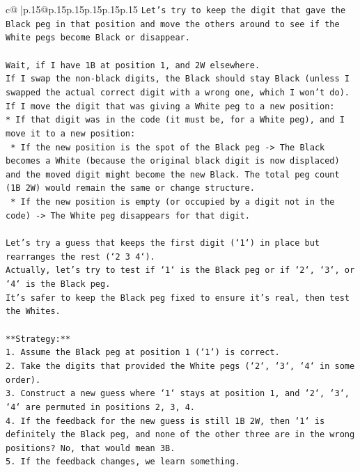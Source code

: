 \documentclass{article}
\begin{document}
{\begin{supertabular}{c@{$\;$}|p{.15\linewidth}@{}p{.15\linewidth}p{.15\linewidth}p{.15\linewidth}p{.15\linewidth}p{.15\linewidth}}
{{{\texttt{Let's try to keep the digit that gave the Black peg in that position and move the others around to see if the White pegs become Black or disappear.} \\
\\ 
\texttt{Wait, if I have 1B at position 1, and 2W elsewhere.} \\
\texttt{If I swap the non{-}black digits, the Black should stay Black (unless I swapped the actual correct digit with a wrong one, which I won't do).} \\
\texttt{If I move the digit that was giving a White peg to a new position:} \\
\texttt{*   If that digit was in the code (it must be, for a White peg), and I move it to a new position:} \\
\texttt{    *   If the new position is the spot of the Black peg {-}> The Black becomes a White (because the original black digit is now displaced) and the moved digit might become the new Black. The total peg count (1B 2W) would remain the same or change structure.} \\
\texttt{    *   If the new position is empty (or occupied by a digit not in the code) {-}> The White peg disappears for that digit.} \\
\\ 
\texttt{Let's try a guess that keeps the first digit (`1`) in place but rearranges the rest (`2 3 4`).} \\
\texttt{Actually, let's try to test if `1` is the Black peg or if `2`, `3`, or `4` is the Black peg.} \\
\texttt{It's safer to keep the Black peg fixed to ensure it's real, then test the Whites.} \\
\\ 
\texttt{**Strategy:**} \\
\texttt{1.  Assume the Black peg at position 1 (`1`) is correct.} \\
\texttt{2.  Take the digits that provided the White pegs (`2`, `3`, `4` in some order).} \\
\texttt{3.  Construct a new guess where `1` stays at position 1, and `2`, `3`, `4` are permuted in positions 2, 3, 4.} \\
\texttt{4.  If the feedback for the new guess is still 1B 2W, then `1` is definitely the Black peg, and none of the other three are in the wrong positions? No, that would mean 3B.} \\
\texttt{5.  If the feedback changes, we learn something.} \\
}}}
\end{supertabular}}
\end{document}
